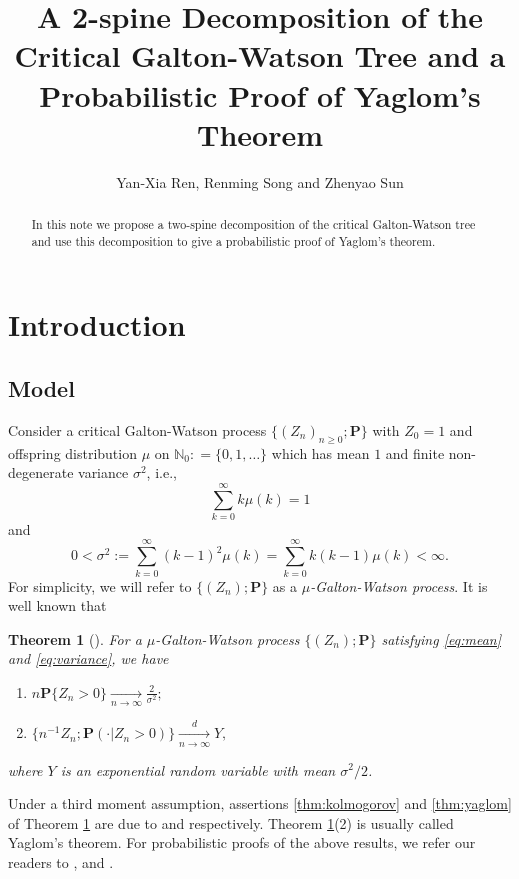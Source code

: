 \documentclass[12pt,a4paper]{amsart}
\title[A 2-spine decomposition and Yaglom's theorem]
{\large A 2-spine Decomposition of the Critical Galton-Watson Tree and a Probabilistic Proof of Yaglom's Theorem}
\author{Yan-Xia Ren, Renming Song and Zhenyao Sun}
\newtheorem{thm}{Theorem}[section]
\numberwithin{equation}{section}
\begin{document}
\begin{abstract}
	In this note  we propose a two-spine decomposition of the critical Galton-Watson tree and use this decomposition to give a probabilistic proof of Yaglom's theorem.
\end{abstract}
\maketitle	
\section{Introduction}
\subsection{Model}
\label{sec:model}
	Consider a critical Galton-Watson process $\{(Z_n)_{n\ge 0}; \mathbf P \}$ with $Z_0 = 1$ and offspring distribution $\mu$ on $\mathbb N_0 : = \{0,1,\dots\}$ which has mean $1$ and finite non-degenerate variance $\sigma^2$, i.e.,
\begin{equation}\label{eq:mean}
 \sum_{k=0}^\infty k \mu(k)	=1
\end{equation}
	and
\begin{equation}\label{eq:variance}
	0	
	<	\sigma^2
	:=	\sum_{k=0}^\infty  (k-1)^2 \mu(k)
	=	\sum_{k=0}^\infty k(k-1) \mu(k)
	<	\infty.
\end{equation}
	For simplicity, we will refer to $\{(Z_n); \mathbf P\}$ as  a  \emph{$\mu$-Galton-Watson process}.
	It is well known that
\begin{thm}[\cite{kesten1966galton}] \label{thm: Kolmogrov and Yaglom theorem}
	For a $\mu$-Galton-Watson process $\{(Z_n); \mathbf P\}$ satisfying \eqref{eq:mean} and \eqref{eq:variance}, we have
\begin{enumerate}
\item \label{thm:kolmogorov}
	$n \mathbf P \{Z_n>0\} \xrightarrow[n \to \infty]{} \frac{2}{\sigma^2};$
\item \label{thm:yaglom}
	$\{n^{-1}Z_n; \mathbf P(\cdot | Z_n>0)\}\xrightarrow[n \to \infty]{d} Y,$
\end{enumerate}
	where $Y$ is an exponential random variable with mean $\sigma^2/2$.
\end{thm}

	Under a third moment assumption, assertions \eqref{thm:kolmogorov} and \eqref{thm:yaglom} of Theorem \ref{thm: Kolmogrov and Yaglom theorem} are due to \cite{kolmogorov1938losung} and \cite{yaglom1947certain} respectively.
	Theorem \ref{thm: Kolmogrov and Yaglom theorem}(2) is usually called Yaglom's theorem.
	For probabilistic proofs of the above results, we refer our readers to
\cite{geiger1999elementary}, \cite{geiger2000new} and \cite{lyons1995conceptual}.
\end{document}
